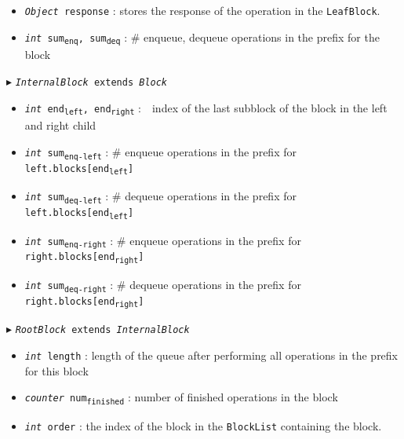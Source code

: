 \documentclass[10pt]{article}
\newcommand{\sub}[1]{\textsubscript{#1}}
\renewcommand{\tt}[1]{\texttt{#1}}
\renewcommand{\sl}[1]{\textsl{#1}}
\theoremstyle{definition}
\begin{document}
\begin{algorithm}
\begin{algorithmic}[1]
\begin{multicols}{2}
\begin{itemize}
    \item \tt{\sl{Object} response}
  \textsf{: stores the response of the operation in the \tt{LeafBlock}.}
  
    \item \tt{\sl{int} sum\sub{enq}, sum\sub{deq}}
  \textsf{: \# enqueue, dequeue operations in the prefix for the block}
  
\end{itemize}

\Statex $\blacktriangleright$ \tt{\sl{InternalBlock} extends \sl{Block}}
\begin{itemize}
    \item \tt{\sl{int} end\sub{left}, end\sub{right}}
  \textsf{:~~index of the last subblock of the block in the left and right child}
  \item \tt{\sl{int} sum\sub{enq-left}}
  \textsf{: \# enqueue operations in the prefix for \tt{left.blocks[end\sub{left}]}}
  \item \tt{\sl{int} sum\sub{deq-left}}
  \textsf{: \# dequeue operations in the prefix for \tt{left.blocks[end\sub{left}]}}
  \item \tt{\sl{int} sum\sub{enq-right}}
  \textsf{: \# enqueue operations in the prefix for \tt{right.blocks[end\sub{right}]}}
  \item \tt{\sl{int} sum\sub{deq-right}}
  \textsf{: \# dequeue operations in the prefix for \tt{right.blocks[end\sub{right}]}}
\end{itemize}


\Statex $\blacktriangleright$ \tt{\sl{RootBlock} extends \sl{InternalBlock}}
\begin{itemize}
  \item \tt{\sl{int} length}
  \textsf{: length of the queue after performing all operations in the prefix for this block}
  \item \tt{\sl{counter} num\sub{finished}}
  \textsf{: number of finished operations in the block}
    \item \tt{\sl{int} order}
  \textsf{: the index of the block in the \tt{BlockList} containing the block.}
\end{itemize}



\end{multicols}
\end{algorithmic}
\end{algorithm}
\end{document}
